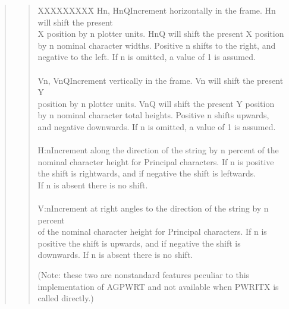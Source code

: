 \documentclass[11pt]{article}
\renewcommand{\_}{{\tt\char'137}}     %
\begin{document}
\begin{quote}
\begin{quote}
\begin{tabbing}
XXXXXXXXX\=\kill
Hn, HnQ\>Increment horizontally in the frame.  Hn will shift the present\\
\>X position by n plotter units. HnQ will shift the present X position\\
\>by n nominal character widths.  Positive n shifts to the right, and\\
\>negative to the left.  If n is omitted, a value of 1 is assumed.\\
\\
Vn, VnQ\>Increment vertically in the frame.  Vn will shift the present Y\\
\>position by n plotter units.  VnQ will shift the present Y position\\
\>by n nominal character total heights.  Positive n shifts upwards,\\
\>and negative downwards.  If n is omitted, a value of 1 is assumed.\\
\\
H:n\>Increment along the direction of the string by n percent of the\\
\>nominal character height for Principal characters.  If n is positive\\
\>the shift is rightwards, and if negative the shift is leftwards.\\
\>If n is absent there is no shift.\\
\\
V:n\>Increment at right angles to the direction of the string by n percent\\
\>of the nominal character height for Principal characters.  If n is\\
\>positive the shift is upwards, and if negative the shift is\\
\>downwards.  If n is absent there is no shift.
\end{tabbing}

(Note: these two are nonstandard features peculiar to this
implementation of AGPWRT and not available when PWRITX is
called directly.)


\end{quote}
\end{quote}
\end{document}
